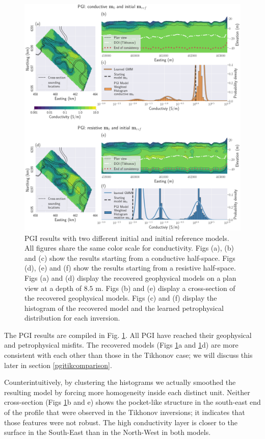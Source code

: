 \documentclass[extra]{gji} %
\begin{document}
\begin{figure}
\centering
\includegraphics[width=\textwidth]{./Fig/LowRes/Booky_pgi_result.png}
\caption{PGI results with two different initial and initial reference models. All figures share the same color scale for conductivity. Figs (a), (b) and (c) show the results starting from a conductive half-space. Figs (d), (e) and (f) show the results starting from a resistive half-space. Figs (a) and (d) display the recovered geophysical models on a plan view at a depth of $8.5$ m. Figs (b) and (e) display a cross-section of the recovered geophysical models. Figs (c) and (f) display the histogram of the recovered model and the learned petrophysical distribution for each inversion.}
\label{fig:Book_PGI_Results}
\end{figure}

The PGI results are compiled in Fig. \ref{fig:Book_PGI_Results}. All PGI have reached their geophysical and petrophysical misfits. The recovered models (Figs \ref{fig:Book_PGI_Results}a and \ref{fig:Book_PGI_Results}d) are more consistent with each other than those in the Tikhonov case; we will discuss this later in section \ref{pgitikcomparison}.

Counterintuitively, by clustering the histograms we actually smoothed the resulting model by forcing more homogeneity inside each distinct unit. Neither cross-section (Figs \ref{fig:Book_PGI_Results}b and e) shows the pocket-like structure in the south-east end of the profile that were observed in the Tikhonov inversions; it indicates that those features were not robust. The high conductivity layer is closer to the surface in the South-East than in the North-West in both models.
\end{document}
